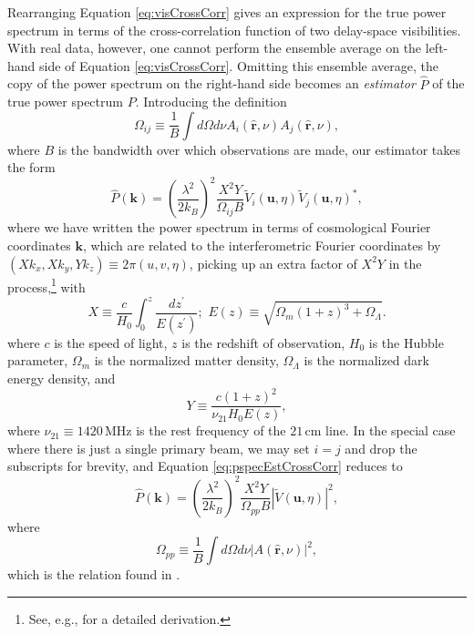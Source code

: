 \documentclass[twocolumn,apj,numberedappendix]{emulateapj}
\newcommand{\rhat}{\hat{\mathbf{r}}}
\begin{document}
Rearranging Equation \eqref{eq:visCrossCorr} gives an expression for the true power spectrum in terms of the cross-correlation function of two delay-space visibilities. With real data, however, one cannot perform the ensemble average on the left-hand side of Equation \eqref{eq:visCrossCorr}. Omitting this ensemble average, the copy of the power spectrum on the right-hand side becomes an \emph{estimator} $\widehat{P}$ of the true power spectrum $P$. Introducing the definition
\begin{equation}
\label{eq:Omega_ij_def}
\Omega_{ij} \equiv \frac{1}{B} \int d\Omega d\nu A_i (\rhat,\nu) A_j (\rhat,\nu),
\end{equation}
where $B$ is the bandwidth over which observations are made, our estimator takes the form
\begin{equation}
\label{eq:pspecEstCrossCorr}
\widehat{P} (\mathbf{k}) = \left( \frac{\lambda^2}{2 k_B} \right)^2 \frac{X^2 Y}{\Omega_{ij} B} \widetilde{V}_i(\mathbf{u},\eta) \widetilde{V}_j(\mathbf{u},\eta)^*,
\end{equation}
where we have written the power spectrum in terms of cosmological Fourier coordinates $\mathbf{k}$, which are related to the interferometric Fourier coordinates by $(X k_x, X k_y, Y k_z) \equiv 2 \pi (u , v, \eta)$, picking up an extra factor of $X^2 Y$ in the process,\footnote{See, e.g., \citet{liu_et_al2014a} for a detailed derivation.} with
\begin{equation}
X \equiv \frac{c}{H_0} \int_0^z \frac{dz^\prime}{E(z^\prime)}; \,\, E(z) \equiv \sqrt{\Omega_m (1+z)^3 + \Omega_\Lambda}.
\end{equation}
where $c$ is the speed of light, $z$ is the redshift of observation, $H_0$ is the Hubble parameter, $\Omega_m$ is the normalized matter density, $\Omega_\Lambda$ is the normalized dark energy density, and
\begin{equation}
Y \equiv  \frac{c(1+z)^2}{\nu_{21} H_0 E(z)},
\end{equation}
where $\nu_{21} \equiv 1420\,\textrm{MHz}$ is the rest frequency of the $21\,\textrm{cm}$ line. In the special case where there is just a single primary beam, we may set $i=j$ and drop the subscripts for brevity, and Equation \eqref{eq:pspecEstCrossCorr} reduces to
\begin{equation}
\label{eq:P14est}
\widehat{P} (\mathbf{k}) = \left( \frac{\lambda^2}{2 k_B} \right)^2 \frac{X^2 Y}{\Omega_{pp} B} | \widetilde{V}(\mathbf{u},\eta) |^2,
\end{equation}
where
\begin{equation}
\Omega_{pp} \equiv \frac{1}{B} \int d\Omega d\nu |A (\rhat,\nu)|^2,
\end{equation}
which is the relation found in \citet{P14}.
\end{document}
